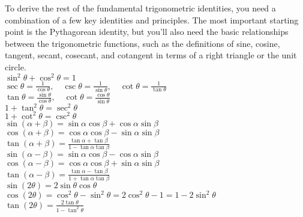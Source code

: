 \documentclass{article}
\begin{document}
To derive the rest of the fundamental trigonometric identities, you need a combination of a few key identities and principles. The most important starting point is the Pythagorean identity, but you’ll also need the basic relationships between the trigonometric functions, such as the definitions of sine, cosine, tangent, secant, cosecant, and cotangent in terms of a right triangle or the unit circle. \\

$ \sin^2 \theta + \cos^2 \theta = 1 $\\

$ \sec \theta = \frac{1}{\cos \theta}, \quad \csc \theta = \frac{1}{\sin \theta}, \quad \cot \theta = \frac{1}{\tan \theta} $\\

$ \tan \theta = \frac{\sin \theta}{\cos \theta}, \quad \cot \theta = \frac{\cos \theta}{\sin \theta} $\\

$ 1 + \tan^2 \theta = \sec^2 \theta $\\

$ 1 + \cot^2 \theta = \csc^2 \theta $\\

$ \sin(\alpha + \beta) = \sin \alpha \cos \beta + \cos \alpha \sin \beta $\\

$ \cos(\alpha + \beta) = \cos \alpha \cos \beta - \sin \alpha \sin \beta $\\

$ \tan(\alpha + \beta) = \frac{\tan \alpha + \tan \beta}{1 - \tan \alpha \tan \beta} $\\

$ \sin(\alpha - \beta) = \sin \alpha \cos \beta - \cos \alpha \sin \beta $\\

$ \cos(\alpha - \beta) = \cos \alpha \cos \beta + \sin \alpha \sin \beta $\\

$ \tan(\alpha - \beta) = \frac{\tan \alpha - \tan \beta}{1 + \tan \alpha \tan \beta} $\\

$ \sin(2\theta) = 2\sin \theta \cos \theta $\\

$ \cos(2\theta) = \cos^2 \theta - \sin^2 \theta = 2\cos^2 \theta - 1 = 1 - 2\sin^2 \theta $\\

$ \tan(2\theta) = \frac{2\tan \theta}{1 - \tan^2 \theta} $\\
\end{document}
